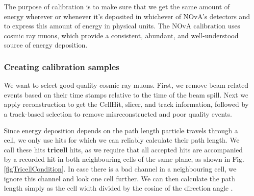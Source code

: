 The purpose of calibration is to make sure that we get the same amount of energy wherever or whenever it's deposited in whichever of NOvA's detectors and to express this amount of energy in physical units. The NOvA calibration uses cosmic ray muons, which provide a consistent, abundant, and well-understood source of energy deposition.



\subsubsection*{Creating calibration samples}\label{secCreatingCalibrationSamples}

We want to select good quality cosmic ray muons. First, we remove beam related events based on their time stamps relative to the time of the beam spill. Next we apply reconstruction to get the CellHit, slicer, and track information, followed by a track-based selection to remove misreconstructed and poor quality events.

Since energy deposition depends on the path length particle travels through a cell, we only use hits for which we can reliably calculate their path length. We call these hits \textbf{tricell} hits, as we require that all accepted hits are accompanied by a recorded hit in both neighbouring cells of the same plane, as shown in Fig. \ref{figTricellCondition}. In case there is a bad channel in a neighbouring cell, we ignore this channel and look one cell further. We can then calculate the path length simply as the cell width divided by the cosine of the direction angle \cite{NOVA-doc-13579,NOVA-doc-7410}.


